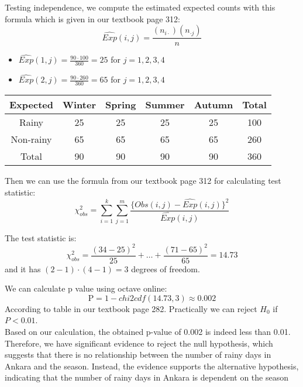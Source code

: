 \documentclass[12pt]{article}
\begin{document}
Testing independence, we compute the estimated expected counts with this formula which is given in our textbook page 312:
$$\widehat{Exp}(i,j) = \dfrac{(n_{i \cdot })(n_{ \cdot j})}{n}$$
\begin{itemize}
    \item $\widehat{Exp}(1,j) = \frac{90\cdot 100}{360} = 25 $ for $j = 1,2,3,4$
    \item $\widehat{Exp}(2,j) = \frac{90\cdot 260}{360} = 65 $ for $j = 1,2,3,4$
\end{itemize}

\begin{center}
    \begin{tabular}{c|cccc|c}
        Expected  & Winter & Spring & Summer & Autumn & Total \\ \hline
        Rainy     & 25     & 25     & 25     & 25     & 100       \\
        Non-rainy & 65     & 65     & 65     & 65     & 260       \\ \hline
        Total & 90     & 90     & 90     & 90     & 360      
    \end{tabular}
\end{center}

Then we can use the formula from our textbook page 312 for calculating test statistic:
$$\chi_{obs}^2 = \sum_{i=1}^k \sum_{j=1}^m \dfrac{\{Obs(i,j) - \widehat{Exp}(i,j)\}^2}{\widehat{Exp}(i,j)}$$

The test statistic is: 
$$\chi_{obs}^2 = \frac{(34-25)^2}{25} + \dots + \frac{(71-65)^2}{65} = 14.73$$
and it has $(2-1)\cdot (4-1) = 3$ degrees of freedom.

We can calculate p value using octave online:
$$\text{P} = 1- chi2cdf(14.73, 3) \approx 0.002$$
According to table in our textbook page 282. Practically we can reject $H_0$ if $P < 0.01$. 
\\


Based on our calculation, the obtained p-value of 0.002 is indeed less than 0.01. Therefore, we have significant evidence to reject the null hypothesis, which suggests that there is no relationship between the number of rainy days in Ankara and the season. Instead, the evidence supports the alternative hypothesis, indicating that the number of rainy days in Ankara is dependent on the season
\end{document}
